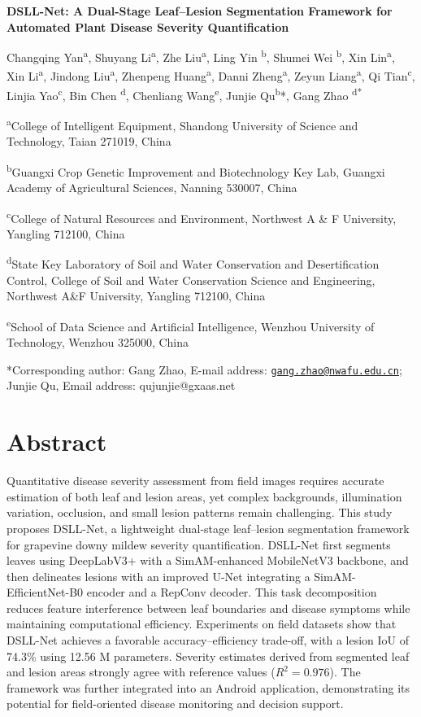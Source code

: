 \documentclass[
]{article}
\author{}
\date{}
\begin{document}
\textbf{DSLL-Net: A Dual-Stage Leaf--Lesion Segmentation Framework for
Automated Plant Disease Severity Quantification}

Changqing Yan\textsuperscript{a}, Shuyang Li\textsuperscript{a}, Zhe
Liu\textsuperscript{a}, Ling Yin \textsuperscript{b}, Shumei Wei
\textsuperscript{b}, Xin Lin\textsuperscript{a}, Xin
Li\textsuperscript{a}, Jindong Liu\textsuperscript{a}, Zhenpeng
Huang\textsuperscript{a}, Danni Zheng\textsuperscript{a}, Zeyun
Liang\textsuperscript{a}, Qi Tian\textsuperscript{c}, Linjia
Yao\textsuperscript{c}, Bin Chen \textsuperscript{d}, Chenliang
Wang\textsuperscript{e}, Junjie Qu\textsuperscript{b}*, Gang Zhao
\textsuperscript{d*}

\textsuperscript{a}College of Intelligent Equipment, Shandong University
of Science and Technology, Taian 271019, China

\textsuperscript{b}Guangxi Crop Genetic Improvement and Biotechnology
Key Lab, Guangxi Academy of Agricultural Sciences, Nanning 530007, China

\textsuperscript{c}College of Natural Resources and Environment,
Northwest A \& F University, Yangling 712100, China

\textsuperscript{d}State Key Laboratory of Soil and Water Conservation
and Desertification Control, College of Soil and Water Conservation
Science and Engineering, Northwest A\&F University, Yangling 712100,
China

\textsuperscript{e}School of Data Science and Artificial Intelligence,
Wenzhou University of Technology, Wenzhou 325000, China

*Corresponding author: Gang Zhao, E-mail address:
\href{mailto:gang.zhao@nwafu.edu.cn}{\nolinkurl{gang.zhao@nwafu.edu.cn}};
Junjie Qu, Email address: qujunjie@gxaas.net

\hypertarget{abstract}{%
\section*{Abstract}\label{abstract}}

Quantitative disease severity assessment from field images requires
accurate estimation of both leaf and lesion areas, yet complex
backgrounds, illumination variation, occlusion, and small lesion patterns
remain challenging. This study proposes DSLL-Net, a lightweight
dual-stage leaf--lesion segmentation framework for grapevine downy mildew
severity quantification. DSLL-Net first segments leaves using DeepLabV3+
with a SimAM-enhanced MobileNetV3 backbone, and then delineates lesions
with an improved U-Net integrating a SimAM-EfficientNet-B0 encoder and a
RepConv decoder. This task decomposition reduces feature interference
between leaf boundaries and disease symptoms while maintaining
computational efficiency. Experiments on field datasets show that
DSLL-Net achieves a favorable accuracy--efficiency trade-off, with a
lesion IoU of 74.3\% using 12.56 M parameters. Severity estimates derived
from segmented leaf and lesion areas strongly agree with reference values
(\(R^{2}=0.976\)). The framework was further integrated into an Android
application, demonstrating its potential for field-oriented disease
monitoring and decision support.
\end{document}
